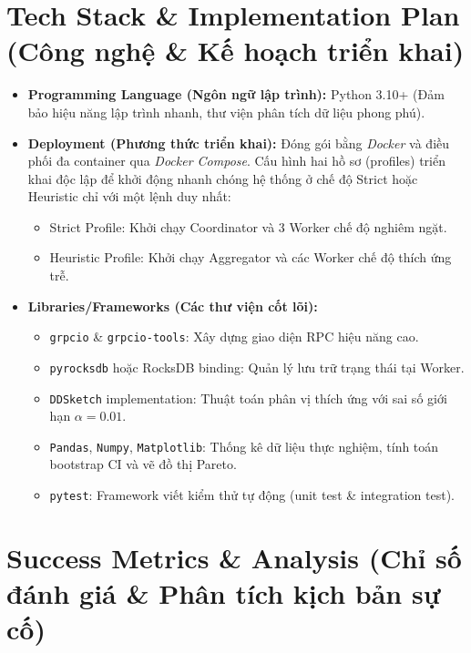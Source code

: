 \documentclass[12pt,a4paper]{article}
\begin{document}
\section{Tech Stack \& Implementation Plan (Công nghệ \& Kế hoạch triển khai)}
\begin{itemize}[leftmargin=*]
    \item \textbf{Programming Language (Ngôn ngữ lập trình):} Python 3.10+ (Đảm bảo hiệu năng lập trình nhanh, thư viện phân tích dữ liệu phong phú).
    \item \textbf{Deployment (Phương thức triển khai):}
    Đóng gói bằng \textit{Docker} và điều phối đa container qua \textit{Docker Compose}. Cấu hình hai hồ sơ (profiles) triển khai độc lập để khởi động nhanh chóng hệ thống ở chế độ Strict hoặc Heuristic chỉ với một lệnh duy nhất:
    \begin{itemize}[label={-}]
        \item Strict Profile: Khởi chạy Coordinator và 3 Worker chế độ nghiêm ngặt.
        \item Heuristic Profile: Khởi chạy Aggregator và các Worker chế độ thích ứng trễ.
    \end{itemize}
    \item \textbf{Libraries/Frameworks (Các thư viện cốt lõi):}
    \begin{itemize}[label={-}]
        \item \texttt{grpcio} \& \texttt{grpcio-tools}: Xây dựng giao diện RPC hiệu năng cao.
        \item \texttt{pyrocksdb} hoặc RocksDB binding: Quản lý lưu trữ trạng thái tại Worker.
        \item \texttt{DDSketch} implementation: Thuật toán phân vị thích ứng với sai số giới hạn $\alpha = 0.01$.
        \item \texttt{Pandas}, \texttt{Numpy}, \texttt{Matplotlib}: Thống kê dữ liệu thực nghiệm, tính toán bootstrap CI và vẽ đồ thị Pareto.
        \item \texttt{pytest}: Framework viết kiểm thử tự động (unit test \& integration test).
    \end{itemize}
\end{itemize}

\vspace{0.5cm}

\section{Success Metrics \& Analysis (Chỉ số đánh giá \& Phân tích kịch bản sự cố)}
\end{document}
